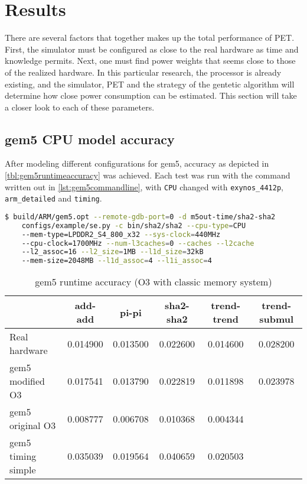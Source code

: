 \section{Results}



There are several factors that together makes up the total performance of PET. First, the simulator must be
configured as close to the real hardware as time and knowledge permits. Next, one must find power weights that
seems close to those of the realized hardware. In this particular research, the processor is already existing,
and the simulator, PET and the strategy of the gentetic algorithm will determine how close power consumption
can be estimated. This section will take a closer look to each of these parameters.

\subsection{gem5 CPU model accuracy}

After modeling different configurations for gem5, accuracy as depicted in \autoref{tbl:gem5runtimeaccuracy}
was achieved. Each test was run with the command written out in \autoref{lst:gem5commandline}, with \texttt{CPU}
changed with  \texttt{exynos\_4412p}, \texttt{arm\_detailed} and \texttt{timing}.

\begin{lstlisting}[language=sh,numbers=none,label={lst:gem5commandline},caption={gem5 Command Line}]
$ build/ARM/gem5.opt --remote-gdb-port=0 -d m5out-time/sha2-sha2
    configs/example/se.py -c bin/sha2/sha2 --cpu-type=CPU
    --mem-type=LPDDR2_S4_800_x32 --sys-clock=440MHz
    --cpu-clock=1700MHz --num-l3caches=0 --caches --l2cache
    --l2_assoc=16 --l2_size=1MB --l1d_size=32kB
    --mem-size=2048MB --l1d_assoc=4 --l1i_assoc=4
\end{lstlisting}


\begin{table}
\centering
\begin{tabular}{|l|c|c|c|c|c|}
\hline
   & add-add & pi-pi & sha2-sha2 & trend-trend & trend-submul\\
\hline
Real hardware & 0.014900  & 0.013500 & 0.022600 & 0.014600 & 0.028200\\
gem5 modified O3    & 0.017541 & 0.013790 & 0.022819 & 0.011898 & 0.023978 \\
gem5 original O3    & 0.008777 & 0.006708 & 0.010368 & 0.004344 & \\
gem5 timing simple  & 0.035039 & 0.019564 & 0.040659 & 0.020503 & \\
\hline
\end{tabular}
\caption{gem5 runtime accuracy (O3 with classic memory system)}
\label{tbl:gem5runtimeaccuracy}
\end{table}




